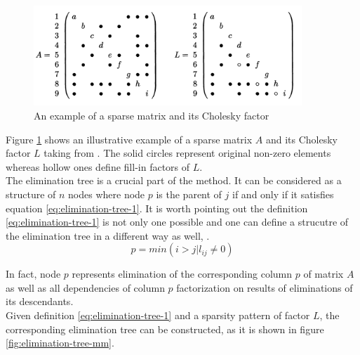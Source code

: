 \begin{figure}[htpb]
  \centering
  \includegraphics[width=0.9\textwidth]{figures/chapter-2/sparsity-pattern-example-mm.png}
\caption{An example of a sparse matrix and its Cholesky factor \cite{mult-frontal-original:2}}
\label{fig:sparsity-pattern-example-mm}
\end{figure}


Figure \ref{fig:sparsity-pattern-example-mm} shows an illustrative example of a sparse matrix $A$ and its Cholesky factor $L$ taking from \cite{mult-frontal-original:2}. The solid circles represent original non-zero elements whereas hollow ones define fill-in factors of $L$. \\


The elimination tree is a crucial part of the method. It can be considered as a structure of $n$ nodes where node $p$ is the parent of $j$ if and only if it satisfies equation \ref{eq:elimination-tree-1}. It is worth pointing out the definition \ref{eq:elimination-tree-1} is not only one possible and one can define a strucutre of the elimination tree in a different way as well, \cite{mult-frontal-original:2}.\\%

\begin{equation} \label{eq:elimination-tree-1}
	p = min(i > j | l_{ij} \neq 0)
\end{equation}


In fact, node $p$ represents elimination of the corresponding column $p$ of matrix $A$ as well as all dependencies of column $p$ factorization on results of eliminations of its descendants.\\


Given definition \ref{eq:elimination-tree-1} and a sparsity pattern of factor $L$, the corresponding elimination tree can be constructed, as it is shown in figure \ref{fig:elimination-tree-mm}.\\


